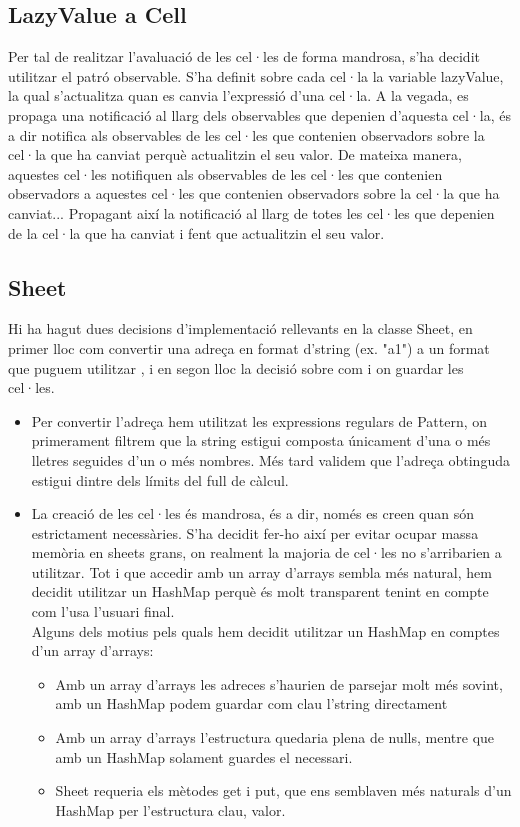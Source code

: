 \documentclass{article}
\begin{document}
	\subsection{LazyValue a Cell}%
Per tal de realitzar l'avaluació de les cel·les de forma mandrosa, s'ha decidit utilitzar el patró observable. S'ha definit sobre cada cel·la la variable lazyValue, la qual s'actualitza quan es canvia l'expressió d'una cel·la. A la vegada, es propaga una notificació al llarg dels observables que depenien d'aquesta cel·la, és a dir notifica als observables de les cel·les que contenien observadors sobre la cel·la que ha canviat perquè actualitzin el seu valor. De mateixa manera, aquestes cel·les notifiquen als observables de les cel·les que contenien observadors a aquestes cel·les que contenien observadors sobre la cel·la que ha canviat... Propagant així la notificació al llarg de totes les cel·les que depenien de la cel·la que ha canviat i fent que actualitzin el seu valor.
	\subsection{Sheet}%
	Hi ha hagut dues decisions d'implementació
	rellevants en la classe Sheet, en primer lloc com
	convertir una adreça en format d'string (ex. "a1")
	a un format que puguem utilitzar
	, i en segon lloc la decisió sobre com i on guardar
	les cel·les.\\

	\begin{itemize}
	\item
	Per convertir l'adreça hem utilitzat les expressions
	regulars de Pattern, on primerament filtrem que la
	string estigui composta únicament d'una o més lletres
	seguides d'un o més nombres. Més tard validem que
	l'adreça obtinguda estigui dintre dels límits del full de càlcul.
	\item
	La creació de les cel·les és mandrosa, és a dir, només es creen quan són estrictament necessàries.
	S'ha decidit fer-ho així per evitar ocupar massa memòria en sheets grans, on realment la majoria
	de cel·les no s'arribarien a utilitzar. Tot i que accedir amb un array d'arrays sembla més natural,
	hem decidit utilitzar un HashMap perquè és molt transparent tenint en compte com l'usa l'usuari final.\\
	Alguns dels motius pels quals hem decidit utilitzar un HashMap en comptes d'un array d'arrays:
	\begin{itemize}
	\item Amb un array d'arrays les adreces s'haurien de
	parsejar molt més sovint, amb un HashMap podem guardar
	com  clau l'string directament
	\item Amb un array d'arrays l'estructura quedaria
	plena de nulls, mentre que amb un HashMap solament
	guardes el necessari.
	\item Sheet requeria els mètodes get i put, que ens
	semblaven més naturals d'un HashMap per l'estructura
	clau, valor.
	\end{itemize}
	\end{itemize}
\end{document}

